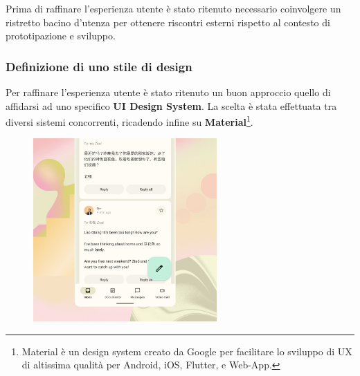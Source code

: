 \documentclass{natourDoc}
\begin{document}
Prima di raffinare l'esperienza utente è stato ritenuto necessario coinvolgere un ristretto bacino d'utenza per ottenere riscontri esterni
rispetto al contesto di prototipazione e sviluppo.

\newpage
\subsubsection{Definizione di uno stile di design}
Per raffinare l'esperienza utente è stato ritenuto un buon approccio quello di affidarsi ad uno specifico \textbf{UI Design System}.
La scelta è stata effettuata tra diversi sistemi concorrenti, ricadendo infine su
\textbf{Material}\footnote{Material è un design system creato da Google per facilitare lo sviluppo di UX di altissima qualità per Android, iOS, Flutter, e Web-App.}.

\FloatBarrier
\begin{figure}[htbp!]
	\centering
	\includegraphics[height=7cm]{usability/material3.jpg}
\end{figure}
\FloatBarrier
\end{document}
